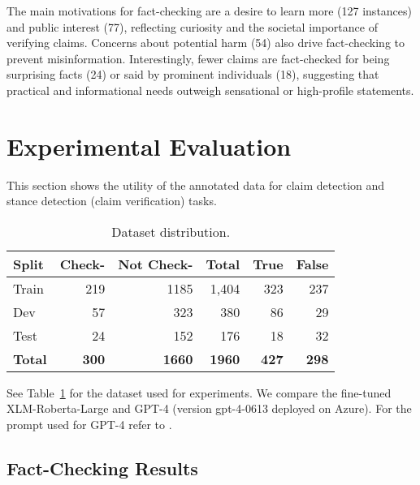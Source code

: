 The main motivations for fact-checking are a desire to learn more (127 instances) and public interest (77), reflecting curiosity and the societal importance of verifying claims. Concerns about potential harm (54) also drive fact-checking to prevent misinformation. Interestingly, fewer claims are fact-checked for being surprising facts (24) or said by prominent individuals (18), suggesting that practical and informational needs outweigh sensational or high-profile statements.

\section{Experimental Evaluation}

This section shows the utility of the annotated data for claim detection and stance detection (claim verification) tasks.


 
\begin{table}[t!!]
    \centering
    \caption{Dataset distribution.}
    \label{tab:dataset}
    \begin{tabular}{l|rrr|rr}
    \hline
      \textbf{Split}   & \textbf{Check-} & \textbf{Not Check-} & \textbf{Total} & \textbf{True} & \textbf{False}   \\ \hline
       Train           & 219                 & 1185         & 1,404   & 323           & 237                     \\
       Dev             & 57                  & 323            & 380   & 86            & 29                       \\
       Test            & 24                  & 152            & 176   & 18            & 32                       \\ \midrule
       \textbf{Total} & \textbf{300} & \textbf{1660}  & \textbf{1960}& \textbf{427} & \textbf{298}\\ \hline
    \end{tabular}
\end{table}

See Table~\ref{tab:dataset} for the dataset used for experiments. We compare the fine-tuned XLM-Roberta-Large and GPT-4 (version gpt-4-0613 deployed on Azure). For the prompt used for GPT-4 refer to \cite{Setty:SIGIR:2024a}.

\subsection{Fact-Checking Results}


